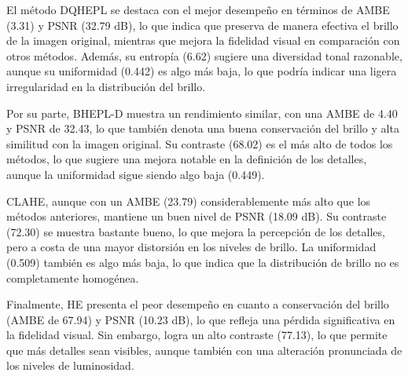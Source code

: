 \documentclass[sigchi]{acmart}
\begin{document}
El método DQHEPL se destaca con el mejor desempeño en términos de AMBE (3.31) y PSNR (32.79
dB), lo que indica que preserva de manera efectiva el brillo de la imagen original, mientras
que mejora la fidelidad visual en comparación con otros métodos. Además, su entropía (6.62)
sugiere una diversidad tonal razonable, aunque su uniformidad (0.442) es algo más baja, lo que
podría indicar una ligera irregularidad en la distribución del brillo.

Por su parte, BHEPL-D muestra un rendimiento similar, con una AMBE de 4.40 y PSNR de 32.43,
lo que también denota una buena conservación del brillo y alta similitud con la imagen
original. Su contraste (68.02) es el más alto de todos los métodos, lo que sugiere una mejora
notable en la definición de los detalles, aunque la uniformidad sigue siendo algo baja (0.449).

CLAHE, aunque con un AMBE (23.79) considerablemente más alto que los métodos anteriores,
mantiene un buen nivel de PSNR (18.09 dB). Su contraste (72.30) se muestra bastante bueno, lo
que mejora la percepción de los detalles, pero a costa de una mayor distorsión en los niveles
de brillo. La uniformidad (0.509) también es algo más baja, lo que indica que la distribución
de brillo no es completamente homogénea.

Finalmente, HE presenta el peor desempeño en cuanto a conservación del brillo (AMBE de 67.94) y
PSNR (10.23 dB), lo que refleja una pérdida significativa en la fidelidad visual. Sin embargo,
logra un alto contraste (77.13), lo que permite que más detalles sean visibles, aunque también
con una alteración pronunciada de los niveles de luminosidad.
\end{document}
